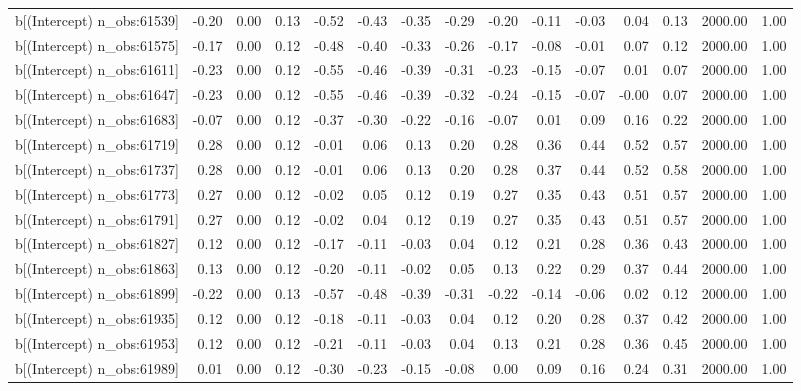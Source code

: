 \begin{table}[ht]
\begin{tabular}{rrrrrrrrrrrrrrr}
  b[(Intercept) n\_obs:61539] & -0.20 & 0.00 & 0.13 & -0.52 & -0.43 & -0.35 & -0.29 & -0.20 & -0.11 & -0.03 & 0.04 & 0.13 & 2000.00 & 1.00 \\ 
  b[(Intercept) n\_obs:61575] & -0.17 & 0.00 & 0.12 & -0.48 & -0.40 & -0.33 & -0.26 & -0.17 & -0.08 & -0.01 & 0.07 & 0.12 & 2000.00 & 1.00 \\ 
  b[(Intercept) n\_obs:61611] & -0.23 & 0.00 & 0.12 & -0.55 & -0.46 & -0.39 & -0.31 & -0.23 & -0.15 & -0.07 & 0.01 & 0.07 & 2000.00 & 1.00 \\ 
  b[(Intercept) n\_obs:61647] & -0.23 & 0.00 & 0.12 & -0.55 & -0.46 & -0.39 & -0.32 & -0.24 & -0.15 & -0.07 & -0.00 & 0.07 & 2000.00 & 1.00 \\ 
  b[(Intercept) n\_obs:61683] & -0.07 & 0.00 & 0.12 & -0.37 & -0.30 & -0.22 & -0.16 & -0.07 & 0.01 & 0.09 & 0.16 & 0.22 & 2000.00 & 1.00 \\ 
  b[(Intercept) n\_obs:61719] & 0.28 & 0.00 & 0.12 & -0.01 & 0.06 & 0.13 & 0.20 & 0.28 & 0.36 & 0.44 & 0.52 & 0.57 & 2000.00 & 1.00 \\ 
  b[(Intercept) n\_obs:61737] & 0.28 & 0.00 & 0.12 & -0.01 & 0.06 & 0.13 & 0.20 & 0.28 & 0.37 & 0.44 & 0.52 & 0.58 & 2000.00 & 1.00 \\ 
  b[(Intercept) n\_obs:61773] & 0.27 & 0.00 & 0.12 & -0.02 & 0.05 & 0.12 & 0.19 & 0.27 & 0.35 & 0.43 & 0.51 & 0.57 & 2000.00 & 1.00 \\ 
  b[(Intercept) n\_obs:61791] & 0.27 & 0.00 & 0.12 & -0.02 & 0.04 & 0.12 & 0.19 & 0.27 & 0.35 & 0.43 & 0.51 & 0.57 & 2000.00 & 1.00 \\ 
  b[(Intercept) n\_obs:61827] & 0.12 & 0.00 & 0.12 & -0.17 & -0.11 & -0.03 & 0.04 & 0.12 & 0.21 & 0.28 & 0.36 & 0.43 & 2000.00 & 1.00 \\ 
  b[(Intercept) n\_obs:61863] & 0.13 & 0.00 & 0.12 & -0.20 & -0.11 & -0.02 & 0.05 & 0.13 & 0.22 & 0.29 & 0.37 & 0.44 & 2000.00 & 1.00 \\ 
  b[(Intercept) n\_obs:61899] & -0.22 & 0.00 & 0.13 & -0.57 & -0.48 & -0.39 & -0.31 & -0.22 & -0.14 & -0.06 & 0.02 & 0.12 & 2000.00 & 1.00 \\ 
  b[(Intercept) n\_obs:61935] & 0.12 & 0.00 & 0.12 & -0.18 & -0.11 & -0.03 & 0.04 & 0.12 & 0.20 & 0.28 & 0.37 & 0.42 & 2000.00 & 1.00 \\ 
  b[(Intercept) n\_obs:61953] & 0.12 & 0.00 & 0.12 & -0.21 & -0.11 & -0.03 & 0.04 & 0.13 & 0.21 & 0.28 & 0.36 & 0.45 & 2000.00 & 1.00 \\ 
  b[(Intercept) n\_obs:61989] & 0.01 & 0.00 & 0.12 & -0.30 & -0.23 & -0.15 & -0.08 & 0.00 & 0.09 & 0.16 & 0.24 & 0.31 & 2000.00 & 1.00 \\ 

\end{tabular}
\end{table}
